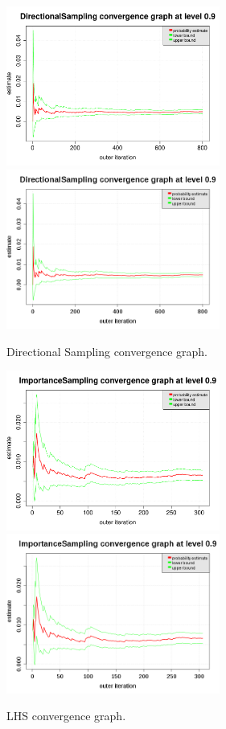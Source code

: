 \documentclass[11pt]{article}
\begin{document}
\begin{figure}[Hhbtp]
  \begin{minipage}{9.8cm}
    \begin{center}
      \ifpdf
      \includegraphics[width=7cm]{convergenceGrapheDS.pdf}
      \else
      \includegraphics[width=7cm]{convergenceGrapheDS.png}
      \fi
      \caption{Directional Sampling convergence graph.}
      \label{DSConvergence}
    \end{center}
  \end{minipage}
  \hfill
  \begin{minipage}{9.8cm}
    \begin{center}
      \ifpdf
      \includegraphics[width=7cm]{convergenceGrapheIS.pdf}
      \else
      \includegraphics[width=7cm]{convergenceGrapheIS.png}
      \fi
      \caption{LHS convergence graph.}
      \label{LHSConvergence2}
    \end{center}
  \end{minipage}
\end{figure}
\end{document}
